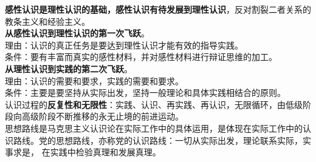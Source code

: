 {\textbf{感性认识是理性认识的基础，感性认识有待发展到理性认识}}，反对割裂二者关系的教条主义和经验主义。\\[2\baselineskip]\textbf{从感性认识到理性认识的第一次飞跃}。\\
理由：认识的真正任务是要达到理性认识才能有效的指导实践。\\
条件：要有丰富而真实的感性材料，并对感性材料进行辩证思维的加工。\\[2\baselineskip]\textbf{从理性认识到实践的第二次飞跃}。\\
理由：认识的需要和要求，实践的需要和要求。\\
条件：主要是要坚持从实际出发，坚持一般理论和具体实践相结合的原则。\\[2\baselineskip]认识过程的\textbf{{反复性和无限性}}：实践、认识、再实践、再认识，无限循环，由低级阶段向高级阶段不断推移的永无止境的前进运动。\\[2\baselineskip]{思想路线是马克思主义认识论在实际工作中的具体运用}，是体现在实际工作中的认识路线。党的思想路线，亦称党的认识路线：一切从实际出发，理论联系实际，实事求是，
在实践中检验真理和发展真理。\\[2\baselineskip]
